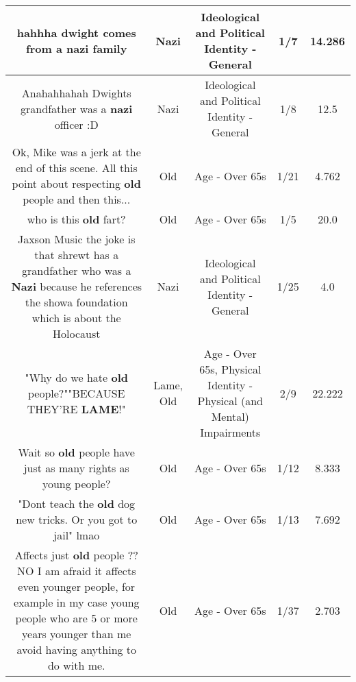 \documentclass[11pt]{article}
\newlength\mylength
\begin{document}
\begin{center}
\begin{longtable}{|C{.65\mylength}|C{.30\mylength}|C{.12\mylength}|C{.12\mylength}|C{.12\mylength}|}
  \small hahhha dwight comes from a \textbf{nazi} family\normalsize   & Nazi &  Ideological and Political Identity - General & 1/7 & 14.286 \\  \hline
  \small Anahahhahah Dwights grandfather was a \textbf{nazi} officer :D\normalsize   & Nazi &  Ideological and Political Identity - General & 1/8 & 12.5 \\  \hline
  \small Ok, Mike was a jerk at the end of this scene. All this point about respecting \textbf{old} people and then this...\normalsize   & Old & Age - Over 65s & 1/21 & 4.762 \\  \hline
  \small who is this \textbf{old} fart?\normalsize   & Old & Age - Over 65s & 1/5 & 20.0 \\  \hline
  \small Jaxson Music the joke is that shrewt has a grandfather who was a \textbf{Nazi} because he references the showa foundation which is about the Holocaust\normalsize   & Nazi &  Ideological and Political Identity - General & 1/25 & 4.0 \\  \hline
  \small "Why do we hate \textbf{old} people?""BECAUSE THEY'RE \textbf{LAME}!"\normalsize   & Lame, Old & Age - Over 65s, Physical Identity - Physical (and Mental) Impairments & 2/9 & 22.222 \\  \hline
  \small Wait so \textbf{old} people have just as many rights as young people?\normalsize   & Old & Age - Over 65s & 1/12 & 8.333 \\  \hline
  \small "Dont teach the \textbf{old} dog new tricks. Or you got to jail" lmao\normalsize   & Old & Age - Over 65s & 1/13 & 7.692 \\  \hline
  \small Affects just \textbf{old} people ?? NO I am afraid it affects even younger people, for example in my case young people who are 5 or more years younger than me avoid having anything to do with me.\normalsize   & Old & Age - Over 65s & 1/37 & 2.703 \\  \hline

\end{longtable}
\end{center}
\end{document}
